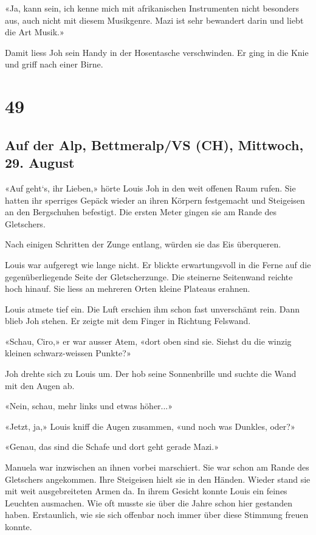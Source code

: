 «Ja, kann sein, ich kenne mich mit afrikanischen Instrumenten nicht
besonders aus, auch nicht mit diesem Musikgenre. Mazi ist sehr bewandert
darin und liebt die Art Musik.»

Damit liess Joh sein Handy in der Hosentasche verschwinden. Er ging in
die Knie und griff nach einer Birne.

\chapter{49}\label{section-49}

\section{Auf der Alp, Bettmeralp/VS (CH), Mittwoch, 29.
August}\label{auf-der-alp-bettmeralpvs-ch-mittwoch-29.-august}

«Auf geht`s, ihr Lieben,» hörte Louis Joh in den weit offenen Raum
rufen. Sie hatten ihr sperriges Gepäck wieder an ihren Körpern
festgemacht und Steigeisen an den Bergschuhen befestigt. Die ersten
Meter gingen sie am Rande des Gletschers.

Nach einigen Schritten der Zunge entlang, würden sie das Eis überqueren.

Louis war aufgeregt wie lange nicht. Er blickte erwartungsvoll in die
Ferne auf die gegenüberliegende Seite der Gletscherzunge. Die steinerne
Seitenwand reichte hoch hinauf. Sie liess an mehreren Orten kleine
Plateaus erahnen.

Louis atmete tief ein. Die Luft erschien ihm schon fast unverschämt
rein. Dann blieb Joh stehen. Er zeigte mit dem Finger in Richtung
Felswand.

«Schau, Ciro,» er war ausser Atem, «dort oben sind sie. Siehst du die
winzig kleinen schwarz-weissen Punkte?»

Joh drehte sich zu Louis um. Der hob seine Sonnenbrille und suchte die
Wand mit den Augen ab.

«Nein, schau, mehr links und etwas höher...»

«Jetzt, ja,» Louis kniff die Augen zusammen, «und noch was Dunkles,
oder?»

«Genau, das sind die Schafe und dort geht gerade Mazi.»

Manuela war inzwischen an ihnen vorbei marschiert. Sie war schon am
Rande des Gletschers angekommen. Ihre Steigeisen hielt sie in den
Händen. Wieder stand sie mit weit ausgebreiteten Armen da. In ihrem
Gesicht konnte Louis ein feines Leuchten ausmachen. Wie oft musste sie
über die Jahre schon hier gestanden haben. Erstaunlich, wie sie sich
offenbar noch immer über diese Stimmung freuen konnte.

